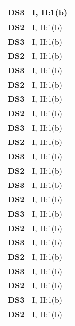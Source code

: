 \begin{xltabular}{\linewidth}{ l | X }
    \textbf{DS3} & I, II:1(b) \\ \hline

    \textbf{DS2} & I, II:1(b) \\ \hline

    \textbf{DS3} & I, II:1(b) \\ \hline

    \textbf{DS2} & I, II:1(b) \\ \hline

    \textbf{DS3} & I, II:1(b) \\ \hline

    \textbf{DS2} & I, II:1(b) \\ \hline

    \textbf{DS3} & I, II:1(b) \\ \hline

    \textbf{DS2} & I, II:1(b) \\ \hline

    \textbf{DS3} & I, II:1(b) \\ \hline

    \textbf{DS2} & I, II:1(b) \\ \hline

    \textbf{DS3} & I, II:1(b) \\ \hline

    \textbf{DS2} & I, II:1(b) \\ \hline

    \textbf{DS3} & I, II:1(b) \\ \hline

    \textbf{DS2} & I, II:1(b) \\ \hline

    \textbf{DS3} & I, II:1(b) \\ \hline

    \textbf{DS2} & I, II:1(b) \\ \hline

    \textbf{DS3} & I, II:1(b) \\ \hline

    \textbf{DS2} & I, II:1(b) \\ \hline

    \textbf{DS3} & I, II:1(b) \\ \hline

    \textbf{DS2} & I, II:1(b) \\ \hline

    \textbf{DS3} & I, II:1(b) \\ \hline

    \textbf{DS2} & I, II:1(b) \\ \hline


\end{xltabular}
